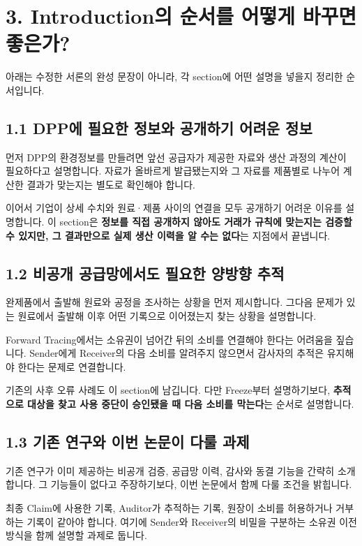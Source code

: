 \section*{3. Introduction의 순서를 어떻게 바꾸면 좋은가?}
아래는 수정한 서론의 완성 문장이 아니라, 각 section에 어떤 설명을 넣을지 정리한 순서입니다.

\subsection*{1.1 DPP에 필요한 정보와 공개하기 어려운 정보}
먼저 DPP의 환경정보를 만들려면 앞선 공급자가 제공한 자료와 생산 과정의 계산이 필요하다고 설명합니다.
자료가 올바르게 발급됐는지와 그 자료를 제품별로 나누어 계산한 결과가 맞는지는 별도로 확인해야 합니다.

이어서 기업이 상세 수치와 원료·제품 사이의 연결을 모두 공개하기 어려운 이유를 설명합니다.
이 section은 \textbf{정보를 직접 공개하지 않아도 거래가 규칙에 맞는지는 검증할 수 있지만, 그 결과만으로 실제 생산 이력을 알 수는 없다}는 지점에서 끝냅니다.

\subsection*{1.2 비공개 공급망에서도 필요한 양방향 추적}
완제품에서 출발해 원료와 공정을 조사하는 상황을 먼저 제시합니다.
그다음 문제가 있는 원료에서 출발해 이후 어떤 기록으로 이어졌는지 찾는 상황을 설명합니다.

Forward Tracing에서는 소유권이 넘어간 뒤의 소비를 연결해야 한다는 어려움을 짚습니다.
Sender에게 Receiver의 다음 소비를 알려주지 않으면서 감사자의 추적은 유지해야 한다는 문제로 연결합니다.

기존의 사후 오류 사례도 이 section에 남깁니다.
다만 Freeze부터 설명하기보다, \textbf{추적으로 대상을 찾고 사용 중단이 승인됐을 때 다음 소비를 막는다}는 순서로 설명합니다.

\subsection*{1.3 기존 연구와 이번 논문이 다룰 과제}
기존 연구가 이미 제공하는 비공개 검증, 공급망 이력, 감사와 동결 기능을 간략히 소개합니다.
그 기능들이 없다고 주장하기보다, 이번 논문에서 함께 다룰 조건을 밝힙니다.

최종 Claim에 사용한 기록, Auditor가 추적하는 기록, 원장이 소비를 허용하거나 거부하는 기록이 같아야 합니다.
여기에 Sender와 Receiver의 비밀을 구분하는 소유권 이전 방식을 함께 설명할 과제로 둡니다.

